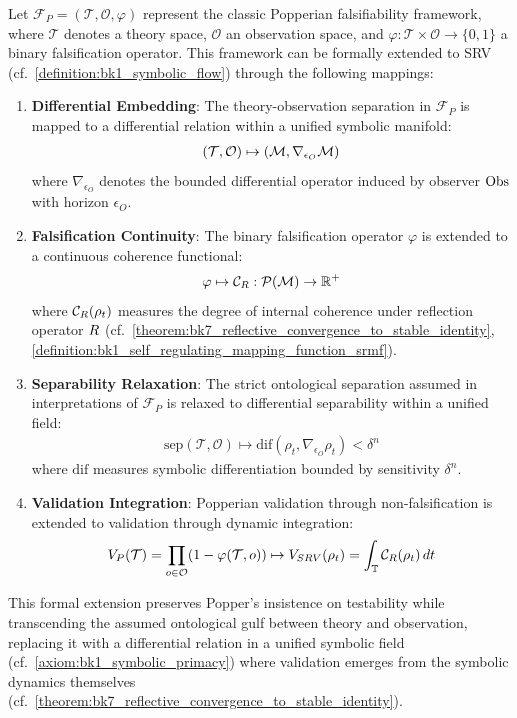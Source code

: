 \begin{scholium}
\label{scholium:bk7_popperian_extension}
Let $\mathcal{F}_P = (\mathcal{T}, \mathcal{O}, \varphi)$ represent the classic Popperian falsifiability framework, where $\mathcal{T}$ denotes a theory space, $\mathcal{O}$ an observation space, and $\varphi: \mathcal{T} \times \mathcal{O} \rightarrow \{0,1\}$ a binary falsification operator. This framework can be formally extended to SRV (cf.~\ref{definition:bk1_symbolic_flow}) through the following mappings:
\begin{enumerate}[label=(\roman*)]
\item \textbf{Differential Embedding}: The theory-observation separation in $\mathcal{F}_P$ is mapped to a differential relation within a unified symbolic manifold:
\begin{align}
(\mathcal{T}, \mathcal{O}) \mapsto (\mathcal{M}, \nabla_{\epsilon_O}\mathcal{M})
\end{align}
where $\nabla_{\epsilon_O}$ denotes the bounded differential operator induced by observer $\mathrm{Obs}$ with horizon $\epsilon_O$.
\item \textbf{Falsification Continuity}: The binary falsification operator $\varphi$ is extended to a continuous coherence functional:
\begin{align}
\varphi \mapsto \mathcal{C}_{R}: \mathcal{P}(\mathcal{M}) \rightarrow \mathbb{R}^+
\end{align}
where $\mathcal{C}_{R}(\rho_t)$ measures the degree of internal coherence under reflection operator $R$ (cf.~\ref{theorem:bk7_reflective_convergence_to_stable_identity}, \ref{definition:bk1_self_regulating_mapping_function_srmf}).
\item \textbf{Separability Relaxation}: The strict ontological separation assumed in interpretations of $\mathcal{F}_P$ is relaxed to differential separability within a unified field:
\begin{align}
\text{sep}(\mathcal{T}, \mathcal{O}) \mapsto \text{dif}(\rho_t, \nabla_{\epsilon_O}\rho_t) < \delta^n
\end{align}
where $\text{dif}$ measures symbolic differentiation bounded by sensitivity $\delta^n$.
\item \textbf{Validation Integration}: Popperian validation through non-falsification is extended to validation through dynamic integration:
\begin{align}
V_P(\mathcal{T}) = \prod_{o \in \mathcal{O}} (1 - \varphi(\mathcal{T}, o)) \mapsto V_{SRV}(\rho_t) = \int_{\mathbb{T}} \mathcal{C}_{R}(\rho_t) \, dt
\end{align}
\end{enumerate}
This formal extension preserves Popper's insistence on testability while transcending the assumed ontological gulf between theory and observation, replacing it with a differential relation in a unified symbolic field (cf.~\ref{axiom:bk1_symbolic_primacy}) where validation emerges from the symbolic dynamics themselves (cf.~\ref{theorem:bk7_reflective_convergence_to_stable_identity}).


\end{scholium}
